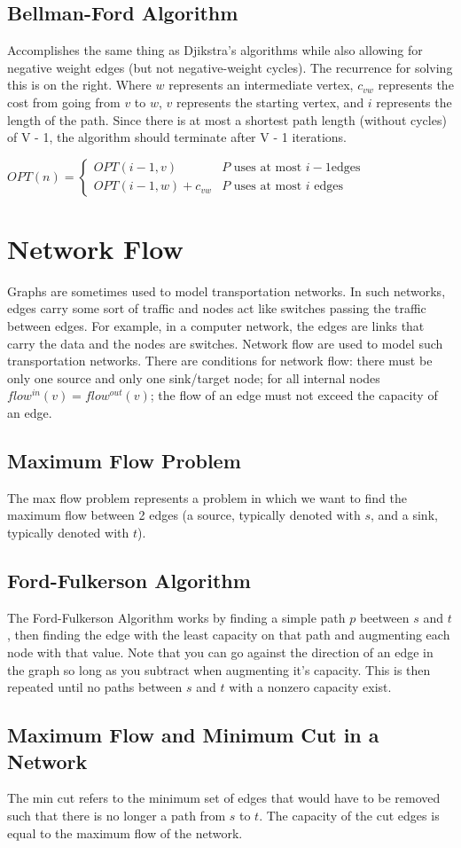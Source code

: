 \documentclass{article}
\begin{document}
\subsection{Bellman-Ford Algorithm}
\begin{multicols}{2}
Accomplishes the same thing as Djikstra's algorithms while also allowing for negative
weight edges (but not negative-weight cycles). The recurrence for solving this is on the right.
Where $w$ represents an intermediate vertex, $c_{vw}$ represents the cost from going from $v$ to $w$,
$v$ represents the starting vertex, and $i$ represents the length of the path. Since there is at most a shortest path length (without cycles) of V - 1, the algorithm should terminate after V - 1 iterations.
\columnbreak

$OPT(n) = \begin{cases}
    OPT(i-1, v)  & P \text{ uses at most } i-1 \text{edges} \\
    OPT(i-1, w) + c_{vw} & P \text{ uses at most } i \text{ edges}
  \end{cases}$
\end{multicols}

\section{Network Flow}
Graphs are sometimes used to model transportation networks. In
such networks, edges carry some sort of traffic and nodes act like switches passing the
traffic between edges. For example, in a computer network, the edges are links that carry
the data and the nodes are switches. Network flow are used to model such transportation
networks. There are conditions for network flow: there must be only one source and only one sink/target node; for all internal nodes $flow^{in}(v) = flow^{out}(v)$; the flow of an edge must not exceed the capacity of an edge.

\subsection{Maximum Flow Problem}
The max flow problem represents a problem in which we want to find the maximum flow between
2 edges (a source, typically denoted with $s$, and a sink, typically denoted with $t$). 

\subsection{Ford-Fulkerson Algorithm}
The Ford-Fulkerson Algorithm works by finding a simple path $p$ beetween $s$ and $t$, then finding
the edge with the least capacity on that path and augmenting each node with that value.
Note that you can go against the direction of an edge in the graph so long as you subtract when augmenting
it's capacity.
This is then repeated until no paths between $s$ and $t$ with a nonzero capacity exist. 

\subsection{Maximum Flow and Minimum Cut in a Network}
The min cut refers to the minimum set of edges that would have to be removed such that there is no longer
a path from $s$ to $t$. The capacity of the cut edges is equal to the maximum flow of the network.
\end{document}
